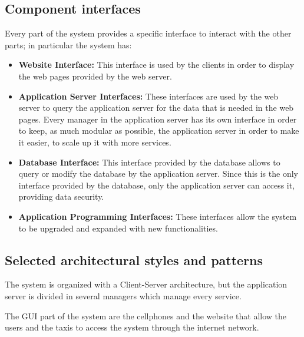 \subsection{Component interfaces}
	Every part of the system provides a specific interface to interact with the other parts; in particular the system has:
	\begin{itemize}
		\item \textbf{Website Interface:} This interface is used by the clients in order to display the web pages provided by the web server.
		\item \textbf{Application Server Interfaces:} These interfaces are used by the web server to query the application server for the data that is needed in the web pages. Every manager in the application server has its own interface in order to keep, as much modular as possible, the application server in order to make it easier, to scale up it with more services.
		\item \textbf{Database Interface:} This interface provided by the database allows to query or modify the database by the application server. Since this is the only interface provided by the database, only the application server can access it, providing data security.
		\item \textbf{Application Programming Interfaces:} These interfaces allow the system to be upgraded and expanded with new functionalities.
	\end{itemize}
\subsection{Selected architectural styles and patterns}
	The system is organized with a Client-Server architecture, but the application server is divided in several managers which manage every service. 
	
	The GUI part of the system are the cellphones and the website that allow the users and the taxis to access the system through the internet network.
	
